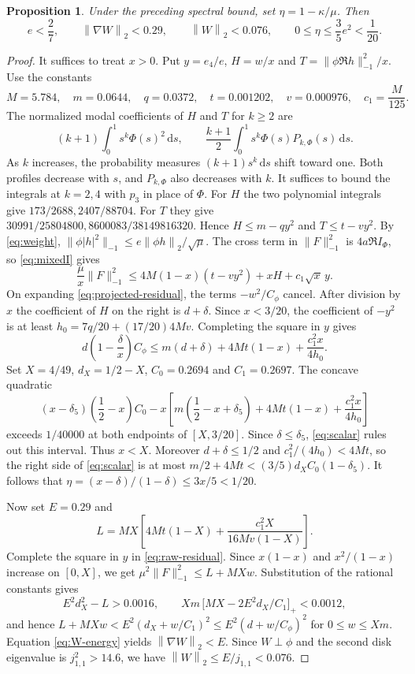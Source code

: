 \documentclass[11pt,a4paper,reqno]{amsart}
\newtheorem{proposition}[theorem]{Proposition}
\theoremstyle{remark}
\numberwithin{equation}{section}
\newcommand{\dd}{\,\mathrm d}
\newcommand{\norm}[1]{\left\|#1\right\|_2}
\newcommand{\Cphi}{C_\phi}
\begin{document}
\begin{proposition}\label{prop:disk}
Under the preceding spectral bound, set $\eta=1-\kappa/\mu$. Then
\begin{equation}\label{eq:energy}
  e<\frac27,\qquad
  \norm{\nabla W}<0.29,\qquad
  \norm{W}<0.076,\qquad
  0\le\eta\le\frac35 e^2<\frac{1}{20}.
\end{equation}
\end{proposition}
\begin{proof}
It suffices to treat $x>0$. Put $y=e_4/e$, $H=w/x$ and
$T=\|\phi\Re h\|_{-1}^2/x$. Use the constants
\[
  M=5.784,\quad m=0.0644,\quad q=0.0372,\quad t=0.001202,\quad v=0.000976,
  \quad c_1=\frac{M}{125}.
\]
The normalized modal coefficients of $H$ and $T$ for $k\ge2$ are
\[
  (k+1)\int_0^1 s^k\Phi(s)^2\dd s,\qquad
  \frac{k+1}{2}\int_0^1 s^k\Phi(s)P_{k,\Phi}(s)\dd s.
\]
As $k$ increases, the probability measures $(k+1)s^k\dd s$ shift toward
one. Both profiles decrease with $s$, and $P_{k,\Phi}$ also decreases with
$k$. It suffices to bound the integrals at $k=2,4$ with $p_3$ in place of
$\Phi$. For $H$ the two polynomial integrals give $173/2688,2407/88704$.
For $T$ they give $30991/25804800,8600083/38149816320$. Hence
$H\le m-qy^2$ and $T\le t-vy^2$. By \eqref{eq:weight},
$\|\phi|h|^2\|_{-1}\le e\norm{\phi h}/\sqrt\mu$. The cross term in
$\|F\|_{-1}^2$ is $4a\Re I_\Phi$, so \eqref{eq:mixedI} gives
\begin{equation}\label{eq:raw-residual}
  \frac{\mu}{x}\|F\|_{-1}^2\le 4M(1-x)(t-vy^2)+xH+c_1\sqrt x\,y.
\end{equation}
On expanding \eqref{eq:projected-residual}, the terms $-w^2/\Cphi$ cancel.
After division by $x$ the coefficient of $H$ on the right is $d+\delta$.
Since $x<3/20$, the coefficient of $-y^2$ is at least
$h_0=7q/20+(17/20)4Mv$. Completing the square in $y$ gives
\begin{equation}\label{eq:scalar}
  d\left(1-\frac{\delta}{x}\right)\Cphi
    \le m(d+\delta)+4Mt(1-x)+\frac{c_1^2 x}{4h_0}.
\end{equation}
Set $X=4/49$, $d_X=1/2-X$, $C_0=0.2694$ and $C_1=0.2697$. The concave
quadratic
\[
  (x-\delta_5)\left(\frac12-x\right)C_0
    -x\left[m\left(\frac12-x+\delta_5\right)+4Mt(1-x)+\frac{c_1^2 x}{4h_0}\right]
\]
exceeds $1/40000$ at both endpoints of $[X,3/20]$. Since
$\delta\le\delta_5$, \eqref{eq:scalar} rules out this interval. Thus $x<X$.
Moreover $d+\delta\le1/2$ and $c_1^2/(4h_0)<4Mt$, so the right side of
\eqref{eq:scalar} is at most $m/2+4Mt<(3/5)d_XC_0(1-\delta_5)$.
It follows that $\eta=(x-\delta)/(1-\delta)\le3x/5<1/20$.

Now set $E=0.29$ and
\[
  L=MX\left[4Mt(1-X)+\frac{c_1^2 X}{16Mv(1-X)}\right].
\]
Complete the square in $y$ in \eqref{eq:raw-residual}. Since $x(1-x)$ and
$x^2/(1-x)$ increase on $[0,X]$, we get $\mu^2\|F\|_{-1}^2\le L+MXw$.
Substitution of the rational constants gives
\[
  E^2 d_X^2-L>0.0016,\qquad
  Xm\,\bigl[MX-2E^2 d_X/C_1\bigr]_+<0.0012,
\]
and hence $L+MXw<E^2(d_X+w/C_1)^2\le E^2(d+w/\Cphi)^2$ for $0\le w\le Xm$.
Equation \eqref{eq:W-energy} yields $\norm{\nabla W}<E$. Since $W\perp\phi$
and the second disk eigenvalue is $j_{1,1}^2>14.6$, we have
$\norm{W}\le E/j_{1,1}<0.076$.
\end{proof}
\end{document}
